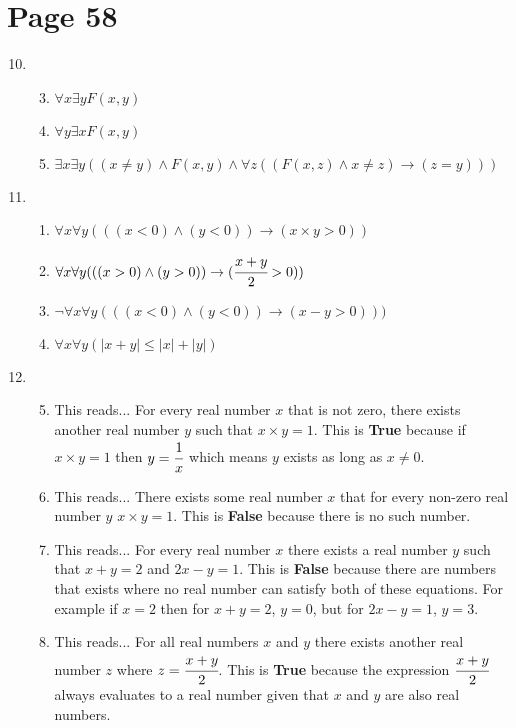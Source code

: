\documentclass[11pt,a4paper,oneside]{article}
\begin{document}
\section*{Page 58}
\begin{enumerate}
\setcounter{enumi}{9} %
\item
\begin{enumerate}
\setcounter{enumii}{2} %
\item \( \forall x \exists y F(x,y) \)
\setcounter{enumii}{4} %
\item \( \forall y \exists x F(x,y) \)
\setcounter{enumii}{9} %
\item \( \exists x \exists y ( ( x \neq y ) \wedge F(x,y) \wedge \forall z ((F(x,z) \wedge x \neq z ) \rightarrow ( z = y ) )) \)
\end{enumerate}

\setcounter{enumi}{19} %
\item
\begin{enumerate} %
\item \( \forall x \forall y ( ( (x < 0) \wedge (y < 0) ) \rightarrow ( x \times y > 0 ) ) \)
\item \( \forall x \forall y ( ( (x > 0) \wedge (y > 0) ) \rightarrow ( \cfrac{x + y}{2} > 0 ) ) \)
\item \( \neg \forall x \forall y ( ( (x < 0) \wedge (y < 0) ) \rightarrow ( x - y > 0 ) ) ) \)
\item \( \forall x \forall y ( |x+y| \leq |x| + |y| ) \)
\end{enumerate}

\newpage

\setcounter{enumi}{27} %
\item
\begin{enumerate}
\setcounter{enumii}{4} %
\item This reads... For every real number $x$ that is not zero, there exists another real number $y$ such that \( x \times y = 1\). This is {\bf True} because if \(x \times y = 1 \) then \( y = \cfrac{1}{x} \) which means $y$ exists as long as \( x \neq 0 \).
\item This reads... There exists some real number $x$ that for every non-zero real number $y$ \( x \times y = 1 \). This is {\bf False} because there is no such number.
\setcounter{enumii}{8} %
\item This reads... For every real number $x$ there exists a real number $y$ such that \( x + y = 2 \) and \( 2x-y=1 \). This is {\bf False} because there are numbers that exists where no real number can satisfy both of these equations.  For example if \( x = 2 \) then for \( x + y = 2 \), \( y = 0 \), but for \( 2x-y = 1 \), \( y = 3 \).
\item This reads... For all real numbers $x$ and $y$ there exists another real number $z$ where \( z = \cfrac{x+y}{2} \).  This is {\bf True} because the expression \( \cfrac{x+y}{2} \) always evaluates to a real number given that $x$ and $y$ are also real numbers.
\end{enumerate}


\end{enumerate}
\end{document}

